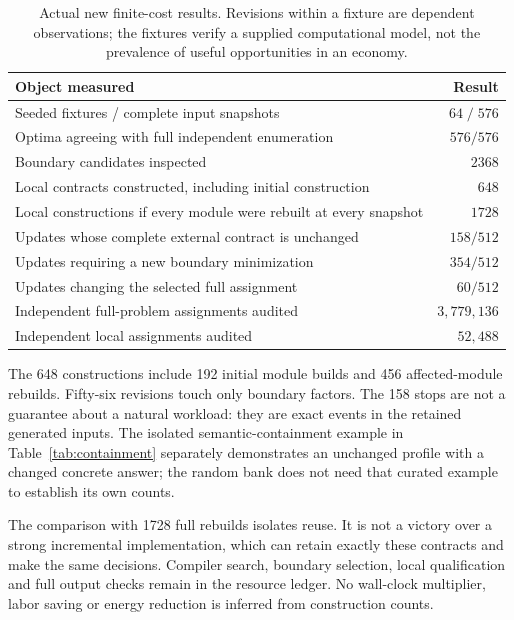 \documentclass[11pt,letterpaper]{article}
\theoremstyle{definition}\newtheorem{definition}[theorem]{Definition}
\theoremstyle{remark}\newtheorem{remark}[theorem]{Remark}
\begin{document}
\begin{table}[htbp]\centering\small
\caption{Actual new finite-cost results. Revisions within a fixture are dependent observations; the fixtures verify a supplied computational model, not the prevalence of useful opportunities in an economy.}
\begin{tabularx}{\linewidth}{@{}Yr@{}}\toprule
Object measured & Result\\\midrule
Seeded fixtures / complete input snapshots & $64\;/\;576$\\
Optima agreeing with full independent enumeration & $576/576$\\
Boundary candidates inspected & $2368$\\
Local contracts constructed, including initial construction & $648$\\
Local constructions if every module were rebuilt at every snapshot & $1728$\\
Updates whose complete external contract is unchanged & $158/512$\\
Updates requiring a new boundary minimization & $354/512$\\
Updates changing the selected full assignment & $60/512$\\
Independent full-problem assignments audited & $3{,}779{,}136$\\
Independent local assignments audited & $52{,}488$\\\bottomrule
\end{tabularx}
\label{tab:finite}
\end{table}

The 648 constructions include 192 initial module builds and 456 affected-module rebuilds. Fifty-six revisions touch only boundary factors. The 158 stops are not a guarantee about a natural workload: they are exact events in the retained generated inputs. The isolated semantic-containment example in Table~\ref{tab:containment} separately demonstrates an unchanged profile with a changed concrete answer; the random bank does not need that curated example to establish its own counts.

The comparison with 1728 full rebuilds isolates reuse. It is not a victory over a strong incremental implementation, which can retain exactly these contracts and make the same decisions. Compiler search, boundary selection, local qualification and full output checks remain in the resource ledger. No wall-clock multiplier, labor saving or energy reduction is inferred from construction counts.
\end{document}
